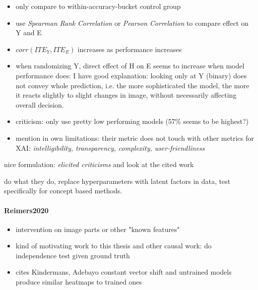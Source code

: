 \begin{itemize}
    \item only compare to within-accuracy-bucket control group
    \item use \textit{Spearman Rank Correlation} or \textit{Pearson Correlation} to compare effect on Y and E
    \item $corr(ITE_Y, ITE_E)$ increases as performance increases
    \item when randomizing Y, direct effect of H on E seems to increase when model performance does: I have good explanation: looking only at Y (binary) does not convey whole prediction, i.e. the more sophisticated the model, the more it reacts slightly to slight changes in image, without necessarily affecting overall decision.
    \item criticism: only use pretty low performing models (57\% seems to be highest?)
    \item mention in own limitations: their metric does not touch with other metrics for XAI: \textit{intelligibility, transparency, complexity, user-friendliness}
    
    
\end{itemize}

nice formulation: \textit{elicited criticisms} and look at the cited work

do what they do, replace hyperparameters with latent factors in data, test specifically for concept based methods. 

\paragraph*{Reimers2020}
\cite{Reimers2020}
\begin{itemize}
      \item intervention on image parts or other "known features"
      \item kind of motivating work to this thesis and other causal work: do independence test given ground truth 
      \item cites Kindermans, Adebayo constant vector shift and untrained models produce similar heatmaps to trained ones
\end{itemize}

